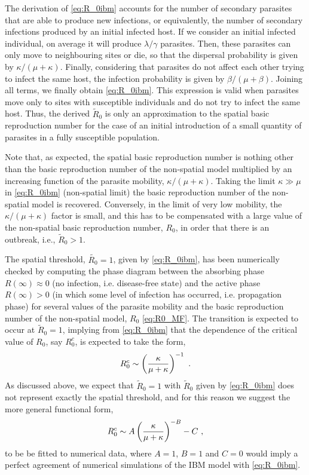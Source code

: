 The derivation of \cref{eq:R_0ibm} accounts for the number of secondary
parasites that are able to produce new infections, or equivalently, the number
of secondary infections produced by an initial infected host. If we consider an
initial infected individual, on average it will produce $\lambda/\gamma$
parasites. Then, these parasites can only move to neighbouring sites or die, so
that the dispersal probability is given by $\kappa/(\mu+\kappa)$. Finally,
considering that parasites do not affect each other trying to infect the same
host, the infection probability is given by $\beta/(\mu+\beta)$. Joining all
terms, we finally obtain \cref{eq:R_0ibm}. This expression is valid when
parasites move only to sites with susceptible individuals and do not try to
infect the same host. Thus, the derived $\tilde{R}_0$ is only an approximation
to the spatial basic reproduction number for the case of an initial
introduction of a small quantity of parasites in a fully susceptible
population.

Note that, as expected, the spatial basic reproduction number is nothing
other than the basic reproduction number of the non-spatial model multiplied by
an increasing function of the parasite mobility, $\kappa/(\mu+\kappa).$ Taking
the limit $\kappa\gg\mu$ in \cref{eq:R_0ibm} (non-spatial limit) the basic
reproduction number of the non-spatial model is recovered. Conversely, in the
limit of very low mobility, the $\kappa/(\mu+\kappa)$ factor is small, and this
has to be compensated with a large value of the non-spatial basic reproduction
number, $R_0$, in order that there is an outbreak, i.e., $\tilde{R}_0>1$.

The spatial threshold, $\tilde{R_0}=1$, given by \cref{eq:R_0ibm}, has been
numerically checked by computing the phase diagram between the absorbing phase
$R(\infty)\approx 0$ (no infection, i.e. disease-free state)  and the active
phase $R(\infty)> 0$ (in which some level of infection has occurred, i.e.
propagation phase) for several values of the parasite mobility and the basic
reproduction number of the non-spatial model, $R_0$ \cref{eq:R0_MF}. The
transition is expected to occur at $\tilde{R}_0=1$, implying from
\cref{eq:R_0ibm} that the dependence of the critical value of $R_0$, say
$R_0^c$, is expected to take the form,
\begin{equation}\label{eq: R_0_crit dependence}
    R_0^c\sim\left(\frac{\kappa}{\mu+\kappa}\right)^{-1} \ .
\end{equation}
As discussed above, we expect that $\tilde{R}_0=1$ with $\tilde{R}_0$ given
by \cref{eq:R_0ibm} does not represent exactly the spatial threshold, and for
this reason we suggest the more general functional form,
\begin{equation}\label{eq: threshold_corrections}
    R_0^c\sim A\parentesi{\frac{\kappa}{\mu+\kappa}}^{-B} - C\ ,
\end{equation}
to be be fitted to numerical data, where $A=1$, $B=1$ and $C=0$ would imply
a perfect agreement of numerical simulations of the IBM model with
\cref{eq:R_0ibm}.

